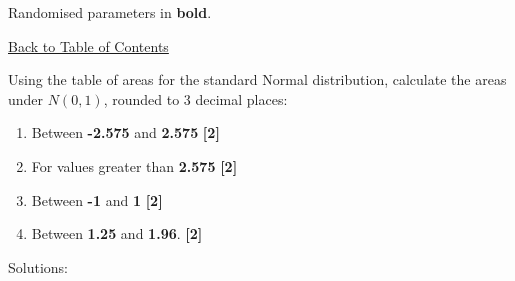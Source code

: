 \documentclass[a4paper, leqno, 12pt]{report}
\newenvironment{top_enumerate}{
\begin{enumerate}
  \setlength{\itemsep}{2em}
  \setlength{\topsep}{-0pt}
  \setlength{\partopsep}{-0pt}
}{\end{enumerate}}
\begin{document}
Randomised parameters in \textbf{bold}. 

\hyperlink{contents}{Back to Table of Contents}
\begin{top_enumerate}
\item Using the table of areas for the standard Normal distribution, calculate the areas under $N(0,1)$, rounded to 3 decimal places:
 
\setcounter{equation}{0}  %
\begin{enumerate}
	\setlength{\topsep}{-0pt}
	\setlength{\partopsep}{-0pt}
	\setlength{\itemsep}{10pt}
			\item Between {\bf -2.575} and {\bf 2.575}
	 \quad \textbf{[2]}
		\item For values greater than {\bf 2.575}
	 \quad \textbf{[2]}
		\item Between {\bf -1} and {\bf 1}
	 \quad \textbf{[2]}
		\item Between {\bf 1.25} and {\bf 1.96}.
	 \quad \textbf{[2]}
\end{enumerate}\addtocounter{enumi}{-1}
\item Solutions:
 

\end{top_enumerate}
\end{document}
